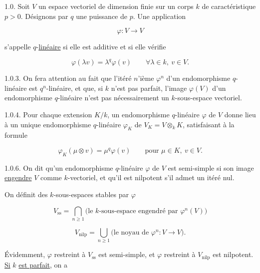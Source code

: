 1.0. Soit $V$ un espace vectoriel de dimension finie sur un corps $k$ de
caractéristique $p>0$. Désignons par $q$ une puissance de $p$. Une application

\begin{equation}\tag{1.0.1}
\varphi:V\longrightarrow V
\end{equation}

s'appelle $q$-\underline{linéaire} si elle est additive et si elle vérifie

\begin{equation}\tag{1.0.2}
\varphi(\lambda v)=\lambda^q\varphi(v)
\qquad \forall\lambda\in k,\ v\in V.
\end{equation}

1.0.3. On fera attention au fait que l'itéré $n$'ième $\varphi^n$ d'un
endomorphisme $q$-linéaire est $q^n$-linéaire, et que, si $k$ n'est pas
parfait, l'image $\varphi(V)$ d'un endomorphisme $q$-linéaire n'est pas
nécessairement un $k$-sous-espace vectoriel.

1.0.4. Pour chaque extension $K/k$, un endomorphisme $q$-linéaire $\varphi$
de $V$ donne lieu à un unique endomorphisme $q$-linéaire $\varphi_K$ de
$V_K=V\otimes_k K$, satisfaisant à la formule

\begin{equation}\tag{1.0.5}
\varphi_K(\mu\otimes v)=\mu^q\varphi(v)
\qquad\text{pour }\mu\in K,\ v\in V.
\end{equation}


1.0.6. On dit qu'un endomorphisme $q$-linéaire $\varphi$ de $V$ est
semi-simple si son image \underline{engendre} $V$ comme $k$-vectoriel, et
qu'il est nilpotent s'il admet un itéré nul.

On définit des $k$-sous-espaces stables par $\varphi$

\begin{equation}\tag{1.0.7}
V_{\mathrm{ss}}=
\bigcap_{n\geq1}
\bigl(\text{le $k$-sous-espace engendré par }\varphi^n(V)\bigr)
\end{equation}

\begin{equation}\tag{1.0.8}
V_{\mathrm{nilp}}=
\bigcup_{n\geq1}\bigl(\text{le noyau de }\varphi^n:V\longrightarrow V\bigr).
\end{equation}

Évidemment, $\varphi$ restreint à $V_{\mathrm{ss}}$ est semi-simple, et
$\varphi$ restreint à $V_{\mathrm{nilp}}$ est nilpotent. \underline{Si} $k$ \underline{est parfait},
on a

